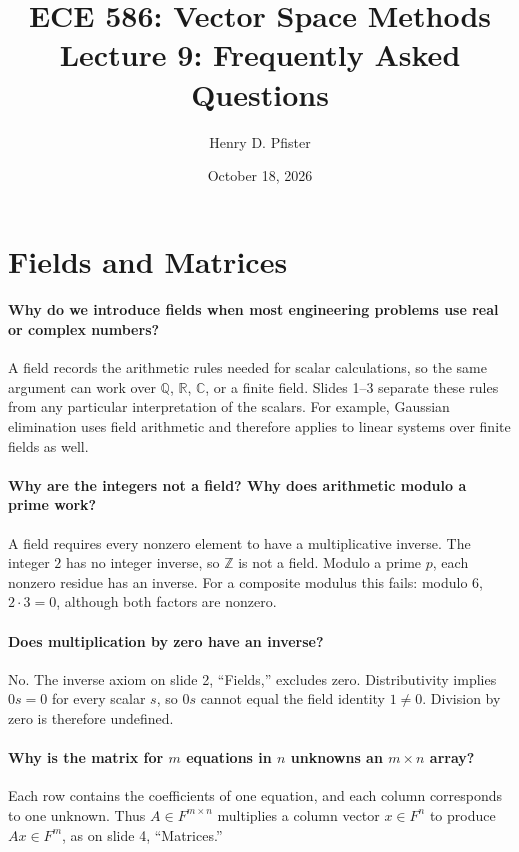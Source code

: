 \documentclass[10pt,english]{article}
\begin{document}
\title{ECE 586: Vector Space Methods \\ Lecture 9: Frequently Asked Questions}
\author{Henry D. Pfister \\ \univ}
\date{October 18, 2026}

\maketitle

\section{Fields and Matrices}

\paragraph{Why do we introduce fields when most engineering problems use real or complex numbers?}
A field records the arithmetic rules needed for scalar calculations, so the same argument can work over $\mathbb{Q}$, $\mathbb{R}$, $\mathbb{C}$, or a finite field.
Slides 1--3 separate these rules from any particular interpretation of the scalars.
For example, Gaussian elimination uses field arithmetic and therefore applies to linear systems over finite fields as well.

\paragraph{Why are the integers not a field? Why does arithmetic modulo a prime work?}
A field requires every nonzero element to have a multiplicative inverse.
The integer $2$ has no integer inverse, so $\mathbb{Z}$ is not a field.
Modulo a prime $p$, each nonzero residue has an inverse.
For a composite modulus this fails: modulo $6$, $2\cdot3=0$, although both factors are nonzero.

\paragraph{Does multiplication by zero have an inverse?}
No. The inverse axiom on slide 2, ``Fields,'' excludes zero.
Distributivity implies $0s=0$ for every scalar $s$, so $0s$ cannot equal the field identity $1\neq0$.
Division by zero is therefore undefined.

\paragraph{Why is the matrix for $m$ equations in $n$ unknowns an $m\times n$ array?}
Each row contains the coefficients of one equation, and each column corresponds to one unknown.
Thus $A\in F^{m\times n}$ multiplies a column vector $x\in F^n$ to produce $Ax\in F^m$, as on slide 4, ``Matrices.''
\end{document}
